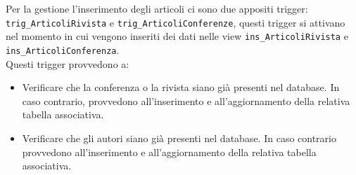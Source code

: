 Per la gestione l'inserimento degli articoli ci sono due appositi trigger: \texttt{trig\_ArticoliRivista} e 
\texttt{trig\_ArticoliConferenze}, questi trigger si attivano nel momento in cui vengono inseriti dei dati
nelle view \texttt{ins\_ArticoliRivista} e \texttt{ins\_ArticoliConferenza}. \\
Questi trigger provvedono a:
\begin{itemize}
    \item Verificare che la conferenza o la rivista siano gi\`a presenti nel database. In caso contrario,
          provvedono all'inserimento e all'aggiornamento della relativa tabella associativa.
    \item Verificare che gli autori siano gi\`a presenti nel database. In caso contrario provvedono all'inserimento
    e  all'aggiornamento della relativa tabella associativa.
\end{itemize}

